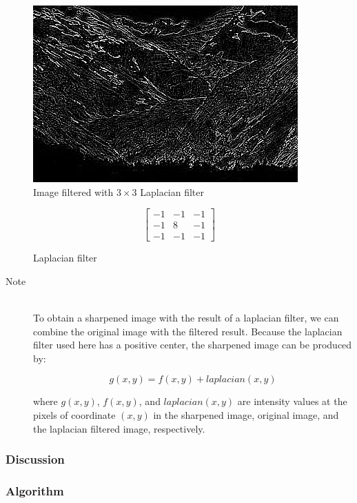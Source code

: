 \documentclass{article}
\begin{document}
\begin{figure}[H]
	\centering
	\includegraphics[width=288pt]{../result/laplacian.png}
	\caption{Image filtered with $3 \times 3$ Laplacian filter}
\end{figure}

\begin{figure}[H]
	\centering
		\[ \begin{bmatrix}
			-1 & -1 & -1 \\
			-1 &  8 & -1 \\
			-1 & -1 & -1
		\end{bmatrix} \]
\caption{Laplacian filter}
\end{figure}

\begin{description}
\item[Note] \hfill \\
To obtain a sharpened image with the result of a laplacian filter, we can combine the original image with the filtered result. Because the laplacian filter used here has a positive center, the sharpened image can be produced by:

$$g(x,y) = f(x, y) + laplacian(x, y)$$

where $g(x, y)$, $f(x, y)$, and $laplacian(x, y)$ are intensity values at the pixels of coordinate $(x, y)$ in the sharpened image, original image, and the laplacian filtered image, respectively.
\end{description}


\subsubsection{Discussion}

\subsubsection{Algorithm}
\end{document}
